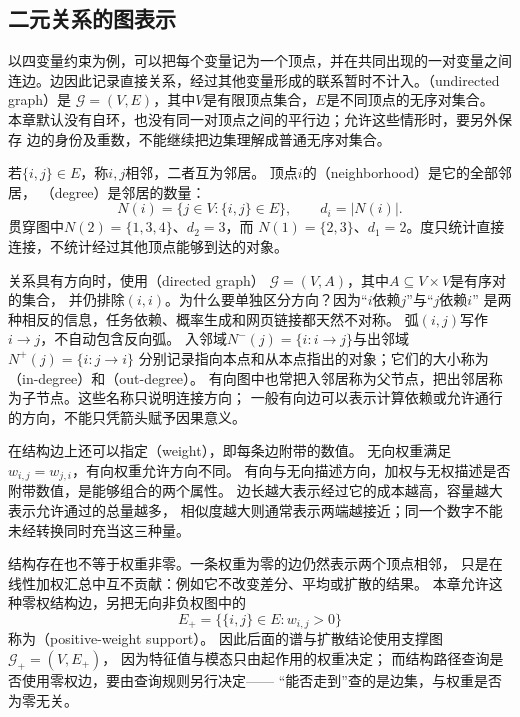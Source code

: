 \subsection{二元关系的图表示}
\label{sec:graph-theory-local-relations}
\label{sec:graph-theory-binary-relations}

以四变量约束为例，可以把每个变量记为一个顶点，并在共同出现的一对变量之间
连边。边因此记录直接关系，经过其他变量形成的联系暂时不计入。（undirected graph）是
\(\mathcal G=(V,E)\)，其中\(V\)是有限顶点集合，\(E\)是不同顶点的无序对集合。
本章默认没有自环，也没有同一对顶点之间的平行边；允许这些情形时，要另外保存
边的身份及重数，不能继续把边集理解成普通无序对集合。

若\(\{i,j\}\in E\)，称\(i,j\)相邻，二者互为邻居。
顶点\(i\)的（neighborhood）是它的全部邻居，
（degree）是邻居的数量：
\[
  N(i)=\{j\in V:\{i,j\}\in E\},\qquad d_i=|N(i)|.
\]
贯穿图中\(N(2)=\{1,3,4\}\)、\(d_2=3\)，而
\(N(1)=\{2,3\}\)、\(d_1=2\)。度只统计直接连接，不统计经过其他顶点能够到达的对象。

关系具有方向时，使用（directed graph）
\(\mathcal G=(V,A)\)，其中\(A\subseteq V\times V\)是有序对的集合，
并仍排除\((i,i)\)。为什么要单独区分方向？因为“\(i\)依赖\(j\)”与“\(j\)依赖\(i\)”
是两种相反的信息，任务依赖、概率生成和网页链接都天然不对称。
弧\((i,j)\)写作\(i\to j\)，不自动包含反向弧。
入邻域\(N^-(j)=\{i:i\to j\}\)与出邻域\(N^+(j)=\{i:j\to i\}\)
分别记录指向本点和从本点指出的对象；它们的大小称为
（in-degree）和（out-degree）。
有向图中也常把入邻居称为父节点，把出邻居称为子节点。这些名称只说明连接方向；
一般有向边可以表示计算依赖或允许通行的方向，不能只凭箭头赋予因果意义。

在结构边上还可以指定（weight），即每条边附带的数值。
无向权重满足\(w_{i,j}=w_{j,i}\)，有向权重允许方向不同。
有向与无向描述方向，加权与无权描述是否附带数值，是能够组合的两个属性。
边长越大表示经过它的成本越高，容量越大表示允许通过的总量越多，
相似度越大则通常表示两端越接近；同一个数字不能未经转换同时充当这三种量。

结构存在也不等于权重非零。一条权重为零的边仍然表示两个顶点相邻，
只是在线性加权汇总中互不贡献：例如它不改变差分、平均或扩散的结果。
本章允许这种零权结构边，另把无向非负权图中的
\[
  E_+=\{\{i,j\}\in E:w_{i,j}>0\}
\]
称为（positive-weight support）。
因此后面的谱与扩散结论使用支撑图\(\mathcal G_+=(V,E_+)\)，
因为特征值与模态只由起作用的权重决定；
而结构路径查询是否使用零权边，要由查询规则另行决定——
“能否走到”查的是边集，与权重是否为零无关。

